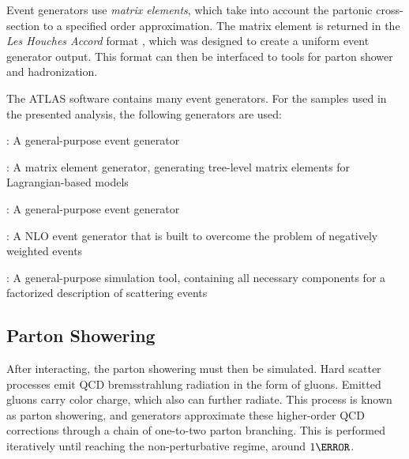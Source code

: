 Event generators use \textit{matrix elements}, which take into account the partonic cross-section to a specified order approximation. The matrix element is returned in the \textit{Les Houches Accord} format \cite{les-houches}, which was designed to create a uniform event generator output. This format can then be interfaced to tools for parton shower and hadronization.

The ATLAS software contains many event generators. For the samples used in the presented analysis, the following generators are used:

\begin{description}
    \item \HERWIGpp: A general-purpose event generator \cite{herwigpp}
    \item \MADGRAPH: A matrix element generator, generating tree-level matrix elements for Lagrangian-based models \cite{mg5}
    \item \PYTHIA: A general-purpose event generator  \cite{pythia8.2}
    \item \POWHEG: A \gls{NLO} event generator that is built to overcome the problem of negatively weighted events \cite{powheg} %
    \item \SHERPA: A general-purpose simulation tool, containing all necessary components for a factorized description of scattering events \cite{sherpa2.2}
\end{description}

\subsection{Parton Showering} \label{ssec:partonshower} %
After interacting, the parton showering must then be simulated. Hard scatter processes emit \gls{QCD} bremsstrahlung radiation in the form of gluons. Emitted gluons carry color charge, which also can further radiate. This process is known as parton showering, and generators approximate these higher-order \gls{QCD} corrections through a chain of one-to-two parton branching. This is performed iteratively until reaching the non-perturbative regime, around $\unit{1}{\GeV}$.


